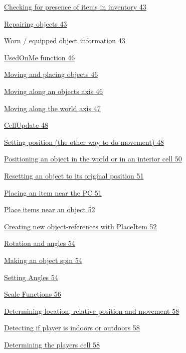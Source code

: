 \documentclass[
]{article}
\begin{document}
\protect\hyperlink{_Toc182634518}{Checking for presence of items in
inventory 43}

\protect\hyperlink{repairing-objects}{Repairing objects 43}

\protect\hyperlink{worn-equipped-object-information}{Worn / equipped
object information 43}

\protect\hyperlink{usedonme-function}{UsedOnMe function 46}

\protect\hyperlink{moving-and-placing-objects}{Moving and placing
objects 46}

\protect\hyperlink{moving-along-an-objects-axis}{Moving along an objects
axis 46}

\protect\hyperlink{moving-along-the-world-axis}{Moving along the world
axis 47}

\protect\hyperlink{cellupdate}{CellUpdate 48}

\protect\hyperlink{setting-position-the-other-way-to-do-movement}{Setting
position (the other way to do movement) 48}

\protect\hyperlink{positioning-an-object-in-the-world-or-in-an-interior-cell}{Positioning
an object in the world or in an interior cell 50}

\protect\hyperlink{resetting-an-object-to-its-original-position}{Resetting
an object to its original position 51}

\protect\hyperlink{placing-an-item-near-the-pc}{Placing an item near the
PC 51}

\protect\hyperlink{place-items-near-an-object}{Place items near an
object 52}

\protect\hyperlink{creating-new-object-references-with-placeitem}{Creating
new object-references with PlaceItem 52}

\protect\hyperlink{rotation-and-angles}{Rotation and angles 54}

\protect\hyperlink{making-an-object-spin}{Making an object spin 54}

\protect\hyperlink{setting-angles}{Setting Angles 54}

\protect\hyperlink{scale-functions}{Scale Functions 56}

\protect\hyperlink{determining-location-relative-position-and-movement}{Determining
location, relative position and movement 58}

\protect\hyperlink{detecting-if-player-is-indoors-or-outdoors}{Detecting
if player is indoors or outdoors 58}

\protect\hyperlink{determining-the-players-cell}{Determining the players
cell 58}
\end{document}
